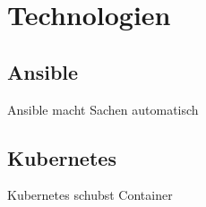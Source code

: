 \chapter{Technologien}\label{ch:technologien}
\section{Ansible}\label{sec:ansible}
Ansible macht Sachen automatisch
\section{Kubernetes}\label{sec:kubernetes}
Kubernetes schubst Container
